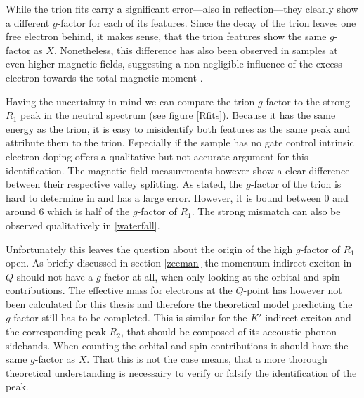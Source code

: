 While the trion fits carry a significant error---also in reflection---they clearly show a different $g$-factor for each of its features. Since the decay of the trion leaves one free electron behind, it makes sense, that the trion features show the same $g$-factor as $X$. Nonetheless, this difference has also been observed in \ws samples at even higher magnetic fields, suggesting a non negligible influence of the excess electron towards the total magnetic moment \cite{plechinger_excitonic_2016}.

Having the uncertainty in mind we can compare the trion $g$-factor to the strong $R_1$ peak in the neutral spectrum (see figure \ref{Rfits}). Because it has the same energy as the trion, it is easy to misidentify both features as the same peak and attribute them to the trion. Especially if the sample has no gate control intrinsic electron doping offers a qualitative but not accurate argument for this identification. The magnetic field measurements however show a clear difference between their respective valley splitting. As stated, the $g$-factor of the trion is hard to determine in \pl and has a large error. However, it is bound between 0 and around 6 which is half of the $g$-factor of $R_1$. The strong mismatch can also be observed qualitatively in \ref{waterfall}.

Unfortunately this leaves the question about the origin of the high $g$-factor of $R_1$ open. As briefly discussed in section \ref{zeeman} the momentum indirect exciton in $Q$ should not have a $g$-factor at all, when only looking at the orbital and spin contributions. The effective mass for electrons at the $Q$-point has however not been calculated for this thesis and therefore the theoretical model predicting the $g$-factor still has to be completed. This is similar for the $K'$ indirect exciton and the corresponding peak $R_2$, that should be composed of its accoustic phonon sidebands. When counting the orbital and spin contributions it should have the same $g$-factor as $X$. That this is not the case means, that a more thorough theoretical understanding is necessairy to verify or falsify the identification of the peak.

